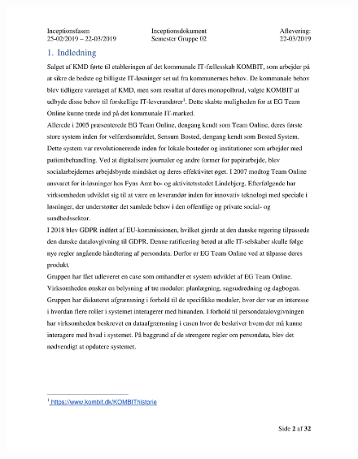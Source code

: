 \begin{figure}[hb]
  \includegraphics[scale = 0.33]{./PNG/Inceptions/Gruppe02+InceptionsDokument-03.jpg} 
\end{figure}



